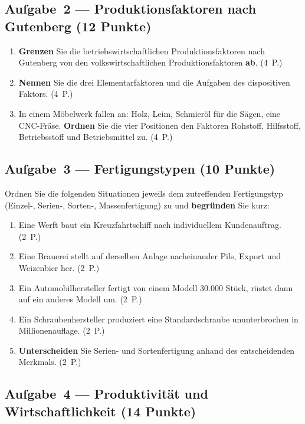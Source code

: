\documentclass[11pt, a4paper]{article}
\begin{document}
\subsection*{Aufgabe~2 --- Produktionsfaktoren nach Gutenberg (12 Punkte)}

\begin{enumerate}[label=(\alph*)]
  \item \textbf{Grenzen} Sie die betriebswirtschaftlichen Produktionsfaktoren nach Gutenberg von den volkswirtschaftlichen Produktionsfaktoren \textbf{ab}. \hfill (4~P.)
  \item \textbf{Nennen} Sie die drei Elementarfaktoren und die Aufgaben des dispositiven Faktors. \hfill (4~P.)
  \item In einem Möbelwerk fallen an: Holz, Leim, Schmieröl für die Sägen, eine CNC-Fräse. \textbf{Ordnen} Sie die vier Positionen den Faktoren Rohstoff, Hilfsstoff, Betriebsstoff und Betriebsmittel zu. \hfill (4~P.)
\end{enumerate}

\subsection*{Aufgabe~3 --- Fertigungstypen (10 Punkte)}

Ordnen Sie die folgenden Situationen jeweils dem zutreffenden Fertigungstyp
(Einzel-, Serien-, Sorten-, Massenfertigung) zu und \textbf{begründen} Sie kurz:

\begin{enumerate}[label=(\alph*)]
  \item Eine Werft baut ein Kreuzfahrtschiff nach individuellem Kundenauftrag. \hfill (2~P.)
  \item Eine Brauerei stellt auf derselben Anlage nacheinander Pils, Export und Weizenbier her. \hfill (2~P.)
  \item Ein Automobilhersteller fertigt von einem Modell 30.000 Stück, rüstet dann auf ein anderes Modell um. \hfill (2~P.)
  \item Ein Schraubenhersteller produziert eine Standardschraube ununterbrochen in Millionenauflage. \hfill (2~P.)
  \item \textbf{Unterscheiden} Sie Serien- und Sortenfertigung anhand des entscheidenden Merkmals. \hfill (2~P.)
\end{enumerate}

\subsection*{Aufgabe~4 --- Produktivität und Wirtschaftlichkeit (14 Punkte)}
\end{document}
